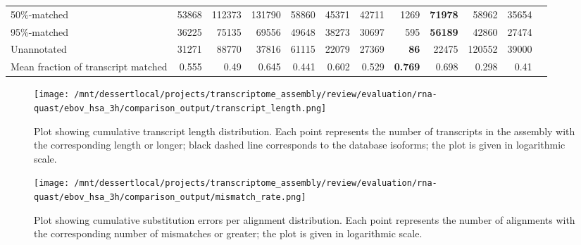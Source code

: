 \documentclass[12pt,a4paper]{article}
\begin{document}
\begin{table}[t]
\begin{adjustbox}{width=1\textwidth}
\begin{tabular}{|l*{11}{|r}|}
50\%-matched                                            & 53868                  & 112373                 & 131790                 & 58860                  & 45371                  & 42711                  & 1269                   & \textbf{71978}         & 58962                  & 35654                  \\
95\%-matched                                            & 36225                  & 75135                  & 69556                  & 49648                  & 38273                  & 30697                  & 595                    & \textbf{56189}         & 42860                  & 27474                  \\
Unannotated                                             & 31271                  & 88770                  & 37816                  & 61115                  & 22079                  & 27369                  & \textbf{86}            & 22475                  & 120552                 & 39000                  \\
Mean fraction of transcript matched                     & 0.555                  & 0.49                   & 0.645                  & 0.441                  & 0.602                  & 0.529                  & \textbf{0.769}         & 0.698                  & 0.298                  & 0.41                   \\ \hline
\end{tabular}
\end{adjustbox}
\end{table}

\FloatBarrier
\clearpage
{}

\begin{figure}[t]
\centering
\texttt{[image: /mnt/dessertlocal/projects/transcriptome\_assembly/review/evaluation/rna-quast/ebov\_hsa\_3h/comparison\_output/transcript\_length.png]}
\caption{Plot showing cumulative transcript length distribution. Each point represents the number of transcripts in the assembly with the corresponding length or longer; black dashed line corresponds to the database isoforms; the plot is given in logarithmic scale.}
\end{figure}
\FloatBarrier
\clearpage


\begin{figure}[t]
\centering
\texttt{[image: /mnt/dessertlocal/projects/transcriptome\_assembly/review/evaluation/rna-quast/ebov\_hsa\_3h/comparison\_output/mismatch\_rate.png]}
\caption{Plot showing cumulative substitution errors per alignment distribution. Each point represents the number of alignments with the corresponding number of mismatches or greater; the plot is given in logarithmic scale.}
\end{figure}
\FloatBarrier
\clearpage
\end{document}
